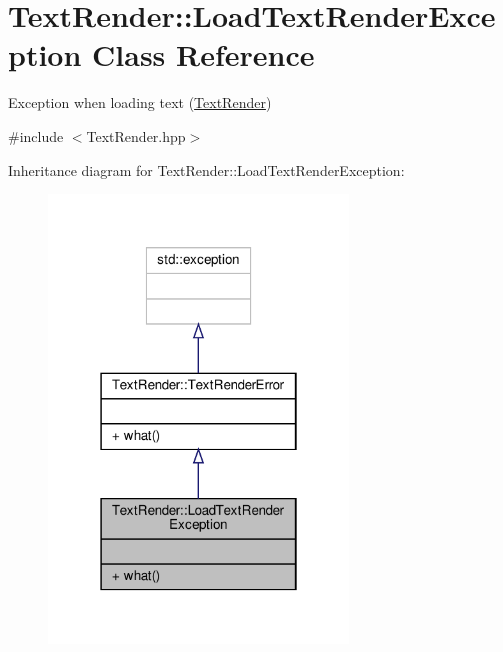 \hypertarget{class_text_render_1_1_load_text_render_exception}{}\section{Text\+Render\+:\+:Load\+Text\+Render\+Exception Class Reference}
\label{class_text_render_1_1_load_text_render_exception}


Exception when loading text (\hyperlink{class_text_render}{Text\+Render})  




{\ttfamily \#include $<$Text\+Render.\+hpp$>$}



Inheritance diagram for Text\+Render\+:\+:Load\+Text\+Render\+Exception\+:
\nopagebreak
\begin{figure}[H]
\begin{center}
\leavevmode
\includegraphics[width=226pt]{class_text_render_1_1_load_text_render_exception__inherit__graph}
\end{center}
\end{figure}


